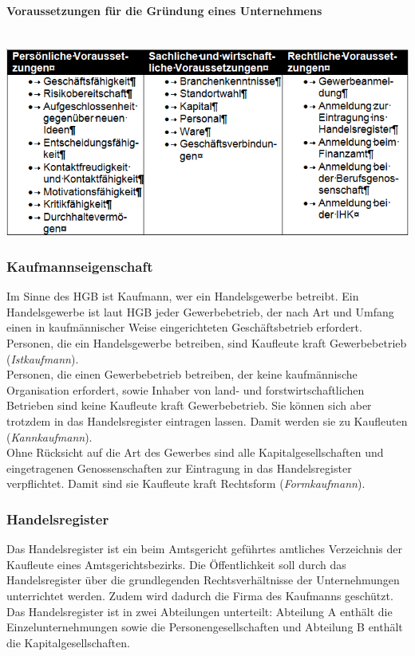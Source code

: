 \paragraph{Voraussetzungen für die Gründung eines Unternehmens} ~\\
\includegraphics[scale=1]{pictures/lf01-pic/lf01-existenzgruendung.png}\\

\subsubsection{Kaufmannseigenschaft}
Im Sinne des HGB ist Kaufmann, wer ein Handelsgewerbe betreibt. Ein Handelsgewerbe ist laut HGB jeder Gewerbebetrieb, der nach Art und Umfang einen in kaufmännischer Weise eingerichteten Geschäftsbetrieb erfordert.\\
Personen, die ein Handelsgewerbe betreiben, sind Kaufleute kraft Gewerbebetrieb ({\it Istkaufmann}).\\
Personen, die einen Gewerbebetrieb betreiben, der keine kaufmännische Organisation erfordert, sowie Inhaber von land- und forstwirtschaftlichen Betrieben sind keine Kaufleute kraft Gewerbebetrieb. Sie können sich aber trotzdem in das Handelsregister eintragen lassen. Damit werden sie zu Kaufleuten ({\it Kannkaufmann}).\\
Ohne Rücksicht auf die Art des Gewerbes sind alle Kapitalgesellschaften und eingetragenen Genossenschaften zur Eintragung in das Handelsregister verpflichtet. Damit sind sie Kaufleute kraft Rechtsform ({\it Formkaufmann}).

\subsubsection{Handelsregister}
Das Handelsregister ist ein beim Amtsgericht geführtes amtliches Verzeichnis der Kaufleute eines Amtsgerichtsbezirks. Die Öffentlichkeit soll durch das Handelsregister über die grundlegenden Rechtsverhältnisse der Unternehmungen unterrichtet werden. Zudem wird dadurch die Firma des Kaufmanns geschützt.\\
Das Handelsregister ist in zwei Abteilungen unterteilt: Abteilung A enthält die Einzelunternehmungen sowie die Personengesellschaften und Abteilung B enthält die Kapitalgesellschaften.\\

